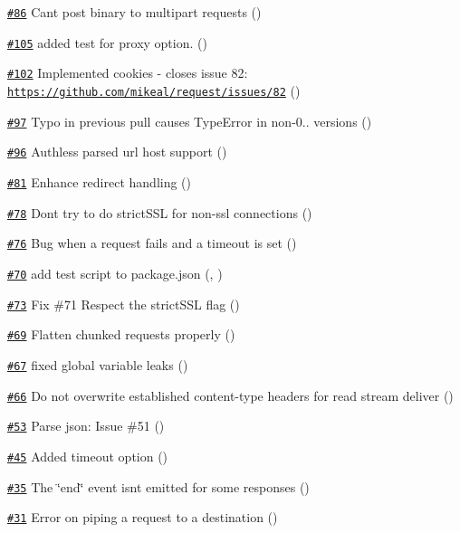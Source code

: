 \begin{DoxyItemize}
\item \href{https://github.com/request/request/pull/86}{\tt \#86} Can\textquotesingle{}t post binary to multipart requests ()
\item \href{https://github.com/request/request/pull/105}{\tt \#105} added test for proxy option. ()
\item \href{https://github.com/request/request/pull/102}{\tt \#102} Implemented cookies -\/ closes issue 82\+: \href{https://github.com/mikeal/request/issues/82}{\tt https\+://github.\+com/mikeal/request/issues/82} ()
\item \href{https://github.com/request/request/pull/97}{\tt \#97} Typo in previous pull causes Type\+Error in non-\/0.. versions ()
\item \href{https://github.com/request/request/pull/96}{\tt \#96} Authless parsed url host support ()
\item \href{https://github.com/request/request/pull/81}{\tt \#81} Enhance redirect handling ()
\item \href{https://github.com/request/request/pull/78}{\tt \#78} Don\textquotesingle{}t try to do strict\+S\+SL for non-\/ssl connections ()
\item \href{https://github.com/request/request/pull/76}{\tt \#76} Bug when a request fails and a timeout is set ()
\item \href{https://github.com/request/request/pull/70}{\tt \#70} add test script to package.\+json (, )
\item \href{https://github.com/request/request/pull/73}{\tt \#73} Fix \#71 Respect the strict\+S\+SL flag ()
\item \href{https://github.com/request/request/pull/69}{\tt \#69} Flatten chunked requests properly ()
\item \href{https://github.com/request/request/pull/67}{\tt \#67} fixed global variable leaks ()
\item \href{https://github.com/request/request/pull/66}{\tt \#66} Do not overwrite established content-\/type headers for read stream deliver ()
\item \href{https://github.com/request/request/pull/53}{\tt \#53} Parse json\+: Issue \#51 ()
\item \href{https://github.com/request/request/pull/45}{\tt \#45} Added timeout option ()
\item \href{https://github.com/request/request/pull/35}{\tt \#35} The \char`\"{}end\char`\"{} event isn\textquotesingle{}t emitted for some responses ()
\item \href{https://github.com/request/request/pull/31}{\tt \#31} Error on piping a request to a destination () 
\end{DoxyItemize}